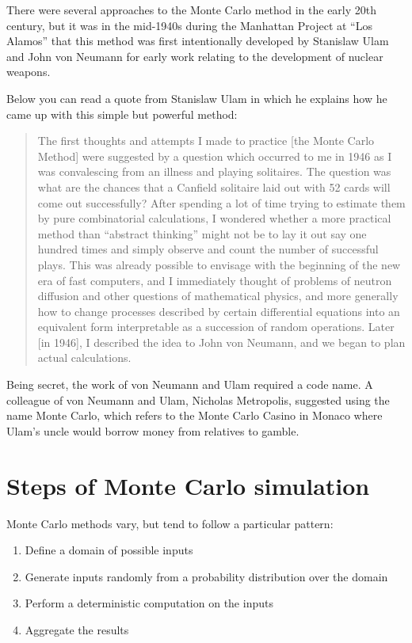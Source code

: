 \documentclass[
]{book}
\begin{document}
There were several approaches to the Monte Carlo method in the early 20th century, but it was in the mid-1940s during the Manhattan Project at ``Los Alamos'' that this method was first intentionally developed by Stanislaw Ulam and John von Neumann for early work relating to the development of nuclear weapons.

Below you can read a quote from Stanislaw Ulam in which he explains how he came up with this simple but powerful method:

\begin{quote}
The first thoughts and attempts I made to practice {[}the Monte Carlo Method{]} were suggested by a question which occurred to me in 1946 as I was convalescing from an illness and playing solitaires. The question was what are the chances that a Canfield solitaire laid out with 52 cards will come out successfully? After spending a lot of time trying to estimate them by pure combinatorial calculations, I wondered whether a more practical method than ``abstract thinking'' might not be to lay it out say one hundred times and simply observe and count the number of successful plays. This was already possible to envisage with the beginning of the new era of fast computers, and I immediately thought of problems of neutron diffusion and other questions of mathematical physics, and more generally how to change processes described by certain differential equations into an equivalent form interpretable as a succession of random operations. Later {[}in 1946{]}, I described the idea to John von Neumann, and we began to plan actual calculations.
\end{quote}

Being secret, the work of von Neumann and Ulam required a code name. A colleague of von Neumann and Ulam, Nicholas Metropolis, suggested using the name Monte Carlo, which refers to the Monte Carlo Casino in Monaco where Ulam's uncle would borrow money from relatives to gamble.

\hypertarget{steps-of-monte-carlo-simulation}{%
\section{Steps of Monte Carlo simulation}\label{steps-of-monte-carlo-simulation}}

Monte Carlo methods vary, but tend to follow a particular pattern:

\begin{enumerate}
\def\labelenumi{\arabic{enumi}.}
\item
  Define a domain of possible inputs
\item
  Generate inputs randomly from a probability distribution over the domain
\item
  Perform a deterministic computation on the inputs
\item
  Aggregate the results
\end{enumerate}
\end{document}
